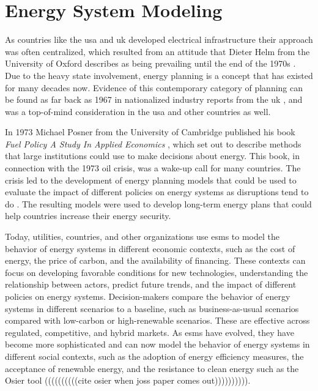 \section{Energy System Modeling}
\label{sec:esm}

As countries like the \gls{usa} and \gls{uk} developed electrical infrastructure their approach was often centralized, which resulted from an attitude that Dieter Helm from the University of Oxford describes as being prevailing until the end of the 1970s \cite{helm_energy_2002}. Due to the heavy state involvement, energy planning is a concept that has existed for many decades now. Evidence of this contemporary category of planning can be found as far back as 1967 in nationalized industry reports from the \gls{uk} \cite{treasury_nationalised_1967}, and was a top-of-mind consideration in the \gls{usa} and other countries as well.

In 1973 Michael Posner from the University of Cambridge published his book \textit{Fuel Policy A Study In Applied Economics} \cite{posner_fuel_1973}, which set out to describe methods that large institutions could use to make decisions about energy. This book, in connection with the 1973 oil crisis, was a wake-up call for many countries. The crisis led to the development of energy planning models that could be used to evaluate the impact of different policies on energy systems as disruptions tend to do \cite{plazas_disrupt_2022}. The resulting models were used to develop long-term energy plans that could help countries increase their energy security.

Today, utilities, countries, and other organizations use \glspl{esm} to model the behavior of energy systems in different economic contexts, such as the cost of energy, the price of carbon, and the availability of financing. These contexts can focus on developing favorable conditions for new technologies, understanding the relationship between actors, predict future trends, and the impact of different policies on energy systems. Decision-makers compare the behavior of energy systems in different scenarios to a baseline, such as business-as-usual scenarios compared with low-carbon or high-renewable scenarios. These are effective across regulated, competitive, and hybrid markets. As \glspl{esm} have evolved, they have become more sophisticated and can now model the behavior of energy systems in different social contexts, such as the adoption of energy efficiency measures, the acceptance of renewable energy, and the resistance to clean energy such as the Osier tool ((((((((((cite osier when joss paper comes out)))))))))).

